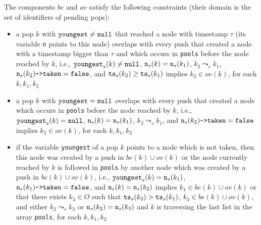 The components $be$ and $ov$ satisfy the following constraints (their domain is the set of identifiers of pending pops):
\vspace{-2mm}
\begin{itemize}
	\item a pop $k$ with ${\tt youngest}\neq {\tt null}$ that reached a node with timestamp $\tau$ (its variable {\tt n} points to this node) overlaps with every push that created a node with a timestamp bigger than $\tau$ and which occurs in {\tt pools} before the node reached by $k$, i.e., ${\tt youngest}_s(k)\neq{\tt null}$, ${\tt n}_s(k)={\tt n}_s(k_1)$, $k_2\leadsto_s k_1$, ${\tt n}_s(k_2)\text{\tt ->taken}={\tt false}$, and ${\tt ts}_s(k_2) \geq {\tt ts}_s(k_1)$ implies $k_2\in ov(k)$, for each $k, k_1, k_2$
	\item a pop $k$ with ${\tt youngest}={\tt null}$ overlaps with every push that created a node which occurs in {\tt pools} before the node reached by $k$,
i.e., ${\tt youngest}_s(k)={\tt null}$, ${\tt n}_s(k)={\tt n}_s(k_1)$, $k_2\leadsto_s k_1$, and ${\tt n}_s(k_2)\text{\tt ->taken}={\tt false}$ implies $k_2\in ov(k)$, for each $k, k_1, k_2$
	\item if the variable {\tt youngest} of a pop $k$ points to a node which is not taken, then this node was created by a push in $be(k)\cup ov(k)$ or the node currently reached by $k$ is followed in {\tt pools} by another node which was created by a push in $be(k)\cup ov(k)$, i.e., ${\tt youngest}_s(k)={\tt n}_s(k_1)$, ${\tt n}_s(k_1)\text{{\tt ->taken}}={\tt false}$, and ${\tt n}_s(k)={\tt n}_s(k_2)$ implies $k_1\in be(k)\cup ov(k)$ or that there exists $k_3\in O$ such that ${\tt ts}_s(k_3) > {\tt ts}_s(k_1)$, $k_3\in be(k)\cup ov(k)$, and either $k_2\leadsto_s k_3$ or ${\tt n}_s(k_2)={\tt n}_s(k_3)$ and $k$ is traversing the last list in the array {\tt pools}, for each $k, k_1,k_2$
%
\vspace{-2mm}
\end{itemize}

